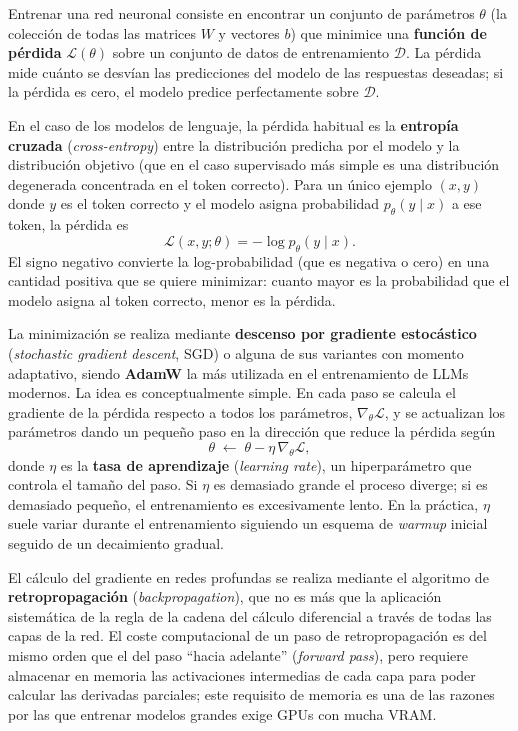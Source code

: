\documentclass[11pt,a4paper]{article}
\begin{document}
Entrenar una red neuronal consiste en encontrar un conjunto de parámetros $\theta$ (la colección de todas las matrices $W$ y vectores $b$) que minimice una \textbf{función de pérdida} $\mathcal{L}(\theta)$ sobre un conjunto de datos de entrenamiento $\mathcal{D}$. La pérdida mide cuánto se desvían las predicciones del modelo de las respuestas deseadas; si la pérdida es cero, el modelo predice perfectamente sobre $\mathcal{D}$.

En el caso de los modelos de lenguaje, la pérdida habitual es la \textbf{entropía cruzada} (\textit{cross-entropy}) entre la distribución predicha por el modelo y la distribución objetivo (que en el caso supervisado más simple es una distribución degenerada concentrada en el token correcto). Para un único ejemplo $(x, y)$ donde $y$ es el token correcto y el modelo asigna probabilidad $p_\theta(y \mid x)$ a ese token, la pérdida es
\[
\mathcal{L}(x,y;\theta) = -\log p_\theta(y \mid x).
\]
El signo negativo convierte la log-probabilidad (que es negativa o cero) en una cantidad positiva que se quiere minimizar: cuanto mayor es la probabilidad que el modelo asigna al token correcto, menor es la pérdida.

La minimización se realiza mediante \textbf{descenso por gradiente estocástico} (\textit{stochastic gradient descent}, SGD) o alguna de sus variantes con momento adaptativo, siendo \textbf{AdamW} la más utilizada en el entrenamiento de LLMs modernos. La idea es conceptualmente simple. En cada paso se calcula el gradiente de la pérdida respecto a todos los parámetros, $\nabla_\theta \mathcal{L}$, y se actualizan los parámetros dando un pequeño paso en la dirección que reduce la pérdida según
\[
\theta \;\leftarrow\; \theta - \eta\,\nabla_\theta \mathcal{L},
\]
donde $\eta$ es la \textbf{tasa de aprendizaje} (\textit{learning rate}), un hiperparámetro que controla el tamaño del paso. Si $\eta$ es demasiado grande el proceso diverge; si es demasiado pequeño, el entrenamiento es excesivamente lento. En la práctica, $\eta$ suele variar durante el entrenamiento siguiendo un esquema de \textit{warmup} inicial seguido de un decaimiento gradual.

El cálculo del gradiente en redes profundas se realiza mediante el algoritmo de \textbf{retropropagación} (\textit{backpropagation}), que no es más que la aplicación sistemática de la regla de la cadena del cálculo diferencial a través de todas las capas de la red. El coste computacional de un paso de retropropagación es del mismo orden que el del paso ``hacia adelante'' (\textit{forward pass}), pero requiere almacenar en memoria las activaciones intermedias de cada capa para poder calcular las derivadas parciales; este requisito de memoria es una de las razones por las que entrenar modelos grandes exige GPUs con mucha VRAM.
\end{document}

